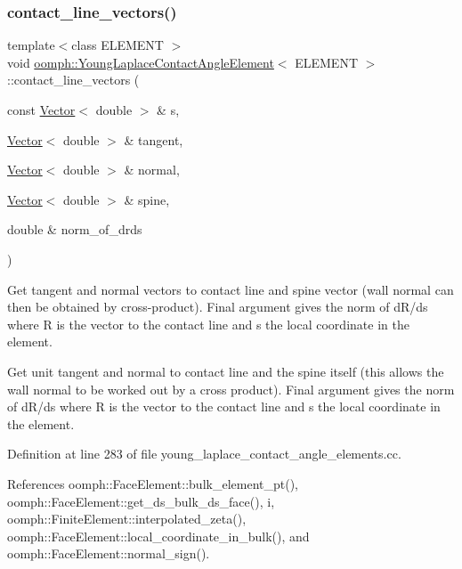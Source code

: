 \subsubsection{\texorpdfstring{contact\+\_\+line\+\_\+vectors()}{contact\_line\_vectors()}\hspace{0.1cm}{\footnotesize\ttfamily [3/3]}}
{\footnotesize\ttfamily template$<$class E\+L\+E\+M\+E\+NT $>$ \\
void \hyperlink{classoomph_1_1YoungLaplaceContactAngleElement}{oomph\+::\+Young\+Laplace\+Contact\+Angle\+Element}$<$ E\+L\+E\+M\+E\+NT $>$\+::contact\+\_\+line\+\_\+vectors (\begin{DoxyParamCaption}\item[{const \hyperlink{classoomph_1_1Vector}{Vector}$<$ double $>$ \&}]{s,  }\item[{\hyperlink{classoomph_1_1Vector}{Vector}$<$ double $>$ \&}]{tangent,  }\item[{\hyperlink{classoomph_1_1Vector}{Vector}$<$ double $>$ \&}]{normal,  }\item[{\hyperlink{classoomph_1_1Vector}{Vector}$<$ double $>$ \&}]{spine,  }\item[{double \&}]{norm\+\_\+of\+\_\+drds }\end{DoxyParamCaption})}



Get tangent and normal vectors to contact line and spine vector (wall normal can then be obtained by cross-\/product). Final argument gives the norm of d\+R/ds where R is the vector to the contact line and s the local coordinate in the element. 

Get unit tangent and normal to contact line and the spine itself (this allows the wall normal to be worked out by a cross product). Final argument gives the norm of d\+R/ds where R is the vector to the contact line and s the local coordinate in the element. 

Definition at line 283 of file young\+\_\+laplace\+\_\+contact\+\_\+angle\+\_\+elements.\+cc.



References oomph\+::\+Face\+Element\+::bulk\+\_\+element\+\_\+pt(), oomph\+::\+Face\+Element\+::get\+\_\+ds\+\_\+bulk\+\_\+ds\+\_\+face(), i, oomph\+::\+Finite\+Element\+::interpolated\+\_\+zeta(), oomph\+::\+Face\+Element\+::local\+\_\+coordinate\+\_\+in\+\_\+bulk(), and oomph\+::\+Face\+Element\+::normal\+\_\+sign().

\mbox{\label{classoomph_1_1YoungLaplaceContactAngleElement_a58e1367abd5655dafc45749cc92a5ce3}} 
